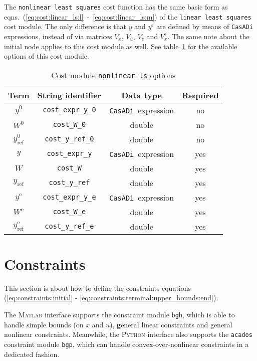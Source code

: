 \documentclass[english]{article}
\newcommand{\code}[1]{\texttt{#1}}
\newcommand{\casadi}{\texttt{CasADi}}
\newcommand{\acados}{\texttt{acados}}
\newcommand{\matlab}{\textsc{Matlab}}
\newcommand{\python}{\textsc{Python}}
\newcommand{\ind}[1]{_{\textrm{#1}}}
\newcommand{\terminal}{^{\textrm{e}}}
\newcommand{\initial}{^{\textrm{0}}}
\newcommand{\mandatory}{yes}
\newcommand{\optional}{no}
\begin{document}
The \code{nonlinear least squares} cost function has the same basic form as eqns.~(\ref{eq:cost:linear_ls:l}~-~\ref{eq:cost:linear_ls:m}) of the \code{linear least squares} cost module.
The only difference is that $ y $ and $ y\terminal $ are defined by means of \casadi{} expressions, instead of via matrices $ V_x $, $ V_u $, $ V_z $ and $ V_x\terminal $. The same note about the initial node applies to this cost module as well.
%
See table~\ref{tab:cost:nonlinear_ls} for the available options of this cost module.
%
\begin{table}[ht!]
    \centering
    \caption{Cost module \code{nonlinear\_ls} options} \label{tab:cost:nonlinear_ls}
    \begin{tabular}{cccc}
        \toprule
        Term & String identifier & Data type & Required \\ \midrule
        $ y\initial $ & \code{cost\_expr\_y\_0}    & \casadi~expression  & \optional   \\
        $ W\initial $ & \code{cost\_W\_0}    & double  & \optional   \\
        $ y\ind{ref}\initial $ & \code{cost\_y\_ref\_0}    & double & \optional    \\ [1em]
        $ y $ & \code{cost\_expr\_y}    & \casadi~expression  & \mandatory   \\
        $ W $ & \code{cost\_W}    & double  & \mandatory   \\
        $ y\ind{ref} $ & \code{cost\_y\_ref}    & double & \mandatory    \\ [1em]
        $ y\terminal $ & \code{cost\_expr\_y\_e}    & \casadi~expression  & \mandatory   \\
        $ W\terminal $ & \code{cost\_W\_e}    & double & \mandatory   \\
        $ y\ind{ref}\terminal $ & \code{cost\_y\_ref\_e}    & double  & \mandatory   \\
        \bottomrule
    \end{tabular}
\end{table}
%
\section{Constraints}\label{sec:constraints}
%
This section is about how to define the constraints equations (\ref{eq:constraints:initial} - \ref{eq:constraints:terminal:upper_bounds:end}).

The \matlab{} interface supports the constraint module \code{bgh}, which is able to handle simple \textbf{b}ounds (on $ x $ and $ u $), \textbf{g}eneral linear constraints and general nonlinear constraints.
Meanwhile, the \python{} interface also supports the \acados{} constraint module \code{bgp}, which can handle convex-over-nonlinear constraints in a dedicated fashion.
\end{document}
